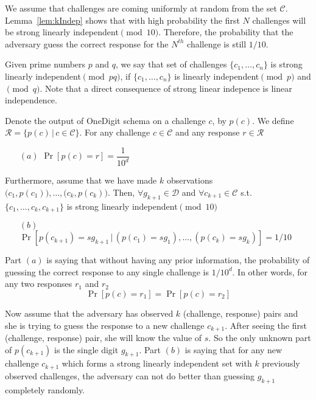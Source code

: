 \documentclass[anon,12pt]{colt2016}
\begin{document}
We assume that challenges are coming uniformly at random from the set $\mathcal{C}$. Lemma~\ref{lem:kIndep} shows that with high probability the first $N$ challenges will be strong linearly independent$\pmod{10}$. Therefore, the probability that the adversary guess the correct response for the $N^{th}$ challenge is still $1/10$.

\begin{definition}
Given prime numbers $p$ and $q$, we say that set of challenges $\{c_1,\ldots,c_n\}$ is strong linearly independent$\pmod{pq}$, if $\{c_1,\ldots,c_n\}$ is linearly independent$\pmod{p}$ and$\pmod{q}$. Note that a direct consequence of strong linear indepence is linear independence.
\end{definition}
                            
\begin{theorem}
\label{thm:main}
	Denote the output of OneDigit schema on a challenge $c$, by $p(c)$. We define $\mathcal{R}=\{p(c) \, | \, c\in\mathcal{C}\}$. For any challenge $c\in \mathcal{C}$ and any response $r\in \mathcal{R}$
	\begin{itemize} 
		\item[$(a)$]$\Pr[p(c)=r]=\dfrac{1}{10^d}$
	\end{itemize}
Furthermore, assume that we have made $k$ observations $\big(c_1,p(c_1)\big),\ldots, \big(c_k, p(c_k)\big)$. Then, $\forall g_{k+1}\in\mathcal{D}$ and $\forall c_{k+1}\in \mathcal{C}$ s.t. $\{c_1,\ldots,c_k,c_{k+1}\}$ is strong linearly independent$\pmod{10}$ 
	\begin{itemize}
		\item[$(b)$] $\Pr[p(c_{k+1})=s g_{k+1} \, | \, (p(c_1)=s g_1),\ldots, (p(c_k)=s g_k)]=1/10$
	\end{itemize}
\end{theorem}

Part $(a)$ is saying that without having any prior information, the probability of guessing the correct response to any single challenge is ${1}/{10^d}$. In other words, for any two responses $r_1$ and $r_2$
$$\Pr[p(c)=r_1]=\Pr[p(c)=r_2]$$

\noindent Now assume that the adversary has observed $k$ (challenge, response) pairs and she is trying to guess the response to a new challenge $c_{k+1}$. After seeing the first (challenge, response) pair, she will know the value of $s$. So the only unknown part of $p(c_{k+1})$ is the single digit $g_{k+1}$. Part $(b)$ is saying that for any new challenge $c_{k+1}$ which forms a strong linearly independent set with $k$ previously observed challenges, the adversary can not do better than guessing $g_{k+1}$ completely randomly.
\end{document}

